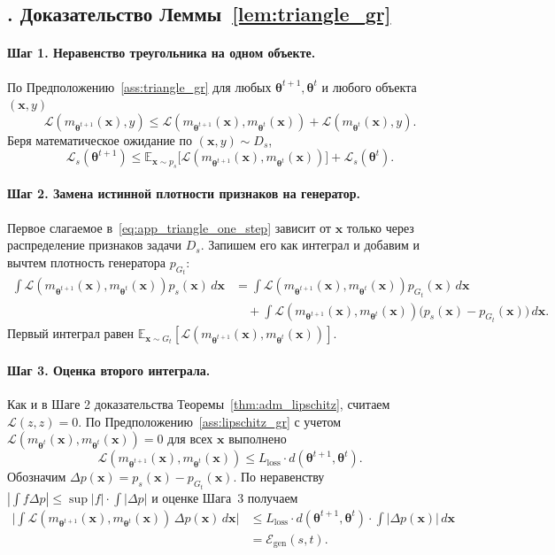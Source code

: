 \documentclass[a4paper,14pt,oneside,openany]{extarticle}
\newcommand{\bx}{\mathbf{x}}
\newcommand{\cL}{\mathcal{L}}
\newcommand{\cE}{\mathcal{E}}
\newcommand{\bbE}{\mathbb{E}}
\newcommand{\btheta}{\boldsymbol{\theta}}
\begin{document}
\subsection*{\theappthm. Доказательство Леммы~\ref{lem:triangle_gr}}\label{app:proof_triangle}

\paragraph{Шаг 1. Неравенство треугольника на одном объекте.} По Предположению~\ref{ass:triangle_gr} для любых $\btheta^{t+1}, \btheta^t$ и любого объекта $(\bx, y)$
\[
    \cL(m_{\btheta^{t+1}}(\bx), y) \le \cL(m_{\btheta^{t+1}}(\bx), m_{\btheta^t}(\bx)) + \cL(m_{\btheta^t}(\bx), y).
\]
Беря математическое ожидание по $(\bx, y) \sim D_s$,
\begin{equation}
    \cL_s(\btheta^{t+1}) \le \bbE_{\bx \sim p_s}\bigl[\cL(m_{\btheta^{t+1}}(\bx), m_{\btheta^t}(\bx))\bigr] + \cL_s(\btheta^t).
    \label{eq:app_triangle_one_step}
\end{equation}

\paragraph{Шаг 2. Замена истинной плотности признаков на генератор.} Первое слагаемое в~\eqref{eq:app_triangle_one_step} зависит от $\bx$ только через распределение признаков задачи $D_s$. Запишем его как интеграл и добавим и вычтем плотность генератора $p_{G_t}$:
\begin{align*}
    \int \cL(m_{\btheta^{t+1}}(\bx), m_{\btheta^t}(\bx)) p_s(\bx)\, d\bx &= \int \cL(m_{\btheta^{t+1}}(\bx), m_{\btheta^t}(\bx)) p_{G_t}(\bx)\, d\bx \\
    &\quad + \int \cL(m_{\btheta^{t+1}}(\bx), m_{\btheta^t}(\bx))\bigl(p_s(\bx) - p_{G_t}(\bx)\bigr)\, d\bx.
\end{align*}
Первый интеграл равен $\bbE_{\bx \sim G_t}[\cL(m_{\btheta^{t+1}}(\bx), m_{\btheta^t}(\bx))]$.

\paragraph{Шаг 3. Оценка второго интеграла.} Как и в Шаге 2 доказательства Теоремы~\ref{thm:adm_lipschitz}, считаем $\cL(z, z) = 0$. По Предположению~\ref{ass:lipschitz_gr} с учетом $\cL(m_{\btheta^t}(\bx), m_{\btheta^t}(\bx)) = 0$ для всех $\bx$ выполнено
\[
    \cL(m_{\btheta^{t+1}}(\bx), m_{\btheta^t}(\bx)) \le L_{\text{loss}}\cdot d(\btheta^{t+1}, \btheta^t).
\]
Обозначим $\Delta p(\bx) = p_s(\bx) - p_{G_t}(\bx)$. По неравенству $|\int f \Delta p|\le \sup|f| \cdot \int|\Delta p|$ и оценке Шага~3 получаем
\begin{align*}
    \biggl|\int \cL(m_{\btheta^{t+1}}(\bx), m_{\btheta^t}(\bx))\,\Delta p(\bx)\, d\bx\biggr|
    &\le L_{\text{loss}}\cdot d(\btheta^{t+1}, \btheta^t)\cdot \int |\Delta p(\bx)|\, d\bx \\
    &= \cE_{\mathrm{gen}}(s, t).
\end{align*}
\end{document}
